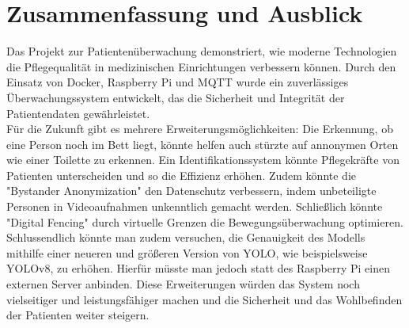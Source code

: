 \section{Zusammenfassung und Ausblick}
Das Projekt zur Patientenüberwachung demonstriert, wie moderne Technologien die Pflegequalität in medizinischen Einrichtungen verbessern können. Durch den Einsatz von Docker, Raspberry Pi und MQTT wurde ein zuverlässiges Überwachungssystem entwickelt, das die Sicherheit und Integrität der Patientendaten gewährleistet.\\

Für die Zukunft gibt es mehrere Erweiterungsmöglichkeiten: Die Erkennung, ob eine Person noch im Bett liegt, könnte helfen auch stürzte auf annonymen Orten wie einer Toilette zu erkennen. Ein Identifikationssystem könnte Pflegekräfte von Patienten unterscheiden und so die Effizienz erhöhen. Zudem könnte die "Bystander Anonymization" den Datenschutz verbessern, indem unbeteiligte Personen in Videoaufnahmen unkenntlich gemacht werden. Schließlich könnte "Digital Fencing" durch virtuelle Grenzen die Bewegungsüberwachung optimieren.\\

Schlussendlich könnte man zudem versuchen, die Genauigkeit des Modells mithilfe einer neueren und größeren Version von YOLO, wie beispielsweise YOLOv8, zu erhöhen. Hierfür müsste man jedoch statt des Raspberry Pi einen externen Server anbinden. Diese Erweiterungen würden das System noch vielseitiger und leistungsfähiger machen und die Sicherheit und das Wohlbefinden der Patienten weiter steigern.\\